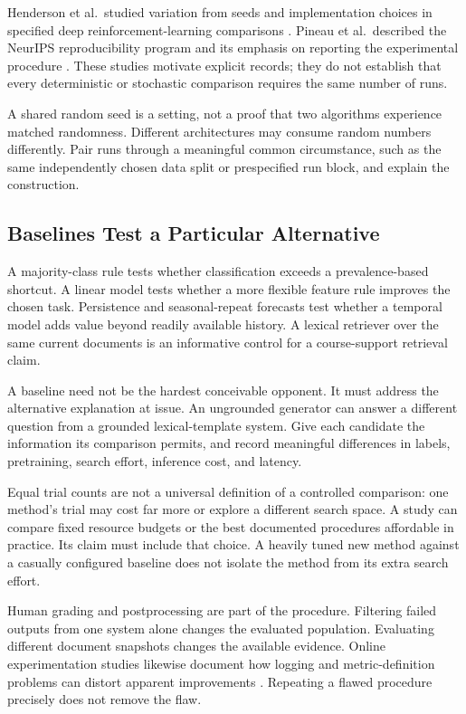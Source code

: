 Henderson et al.\ studied variation from seeds and implementation choices in specified deep reinforcement-learning comparisons \citep{henderson2018}. Pineau et al.\ described the NeurIPS reproducibility program and its emphasis on reporting the experimental procedure \citep{pineau2021}. These studies motivate explicit records; they do not establish that every deterministic or stochastic comparison requires the same number of runs.

A shared random seed is a setting, not a proof that two algorithms experience matched randomness. Different architectures may consume random numbers differently. Pair runs through a meaningful common circumstance, such as the same independently chosen data split or prespecified run block, and explain the construction.

\subsection{Baselines Test a Particular Alternative}

A majority-class rule tests whether classification exceeds a prevalence-based shortcut. A linear model tests whether a more flexible feature rule improves the chosen task. Persistence and seasonal-repeat forecasts test whether a temporal model adds value beyond readily available history. A lexical retriever over the same current documents is an informative control for a course-support retrieval claim.

A baseline need not be the hardest conceivable opponent. It must address the alternative explanation at issue. An ungrounded generator can answer a different question from a grounded lexical-template system. Give each candidate the information its comparison permits, and record meaningful differences in labels, pretraining, search effort, inference cost, and latency.

Equal trial counts are not a universal definition of a controlled comparison: one method's trial may cost far more or explore a different search space. A study can compare fixed resource budgets or the best documented procedures affordable in practice. Its claim must include that choice. A heavily tuned new method against a casually configured baseline does not isolate the method from its extra search effort.

Human grading and postprocessing are part of the procedure. Filtering failed outputs from one system alone changes the evaluated population. Evaluating different document snapshots changes the available evidence. Online experimentation studies likewise document how logging and metric-definition problems can distort apparent improvements \citep{kohavi2012,kohavi2013}. Repeating a flawed procedure precisely does not remove the flaw.

